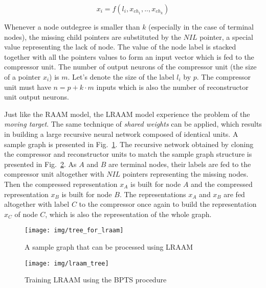 \begin{equation}
x_i = f(l_i, x_{ch_1}, .., x_{ch_k})
\label{eq:lraam_pointer}
\end{equation}

Whenever a node outdegree is smaller than $k$ (especially in the case of terminal nodes), the missing child pointers are substituted by the $NIL$ pointer, a special value representing the lack of node. The value of the node label is stacked together with all the pointers values to form an input vector which is fed to the compressor unit. The number of output neurons of the compressor unit (the size of a pointer $x_i$) is $m$. Let's denote the size of the label $l_i$ by $p$. The compressor unit must have $n = p + k \cdot m$ inputs which is also the number of reconstructor unit output neurons.

Just like the RAAM model, the LRAAM model experience the problem of the \emph{moving target}. The same technique of \emph{shared weights} can be applied, which results in building a large recursive neural network composed of identical units. A sample graph is presented in Fig.~\ref{fig:tree_for_lraam}. The recursive network obtained by cloning the compressor and reconstructor units to match the sample graph structure is presented in Fig.~\ref{fig:lraam_tree}. As $A$ and $B$ are terminal nodes, their labels are fed to the compressor unit altogether with $NIL$ pointers representing the missing nodes. Then the compressed representation $x_{A}$ is built for node $A$ and the compressed representation $x_{B}$ is built for node $B$. The representations $x_A$ and $x_B$ are fed altogether with label $C$ to the compressor once again to build the representation $x_C$ of node $C$, which is also the representation of the whole graph.

\begin{figure}
\begin{center}
	\texttt{[image: img/tree\_for\_lraam]}
	\caption{A sample graph that can be processed using LRAAM}
	\label{fig:tree_for_lraam}
\end{center}
\end{figure}

\begin{figure}
\begin{center}
	\texttt{[image: img/lraam\_tree]}
	\caption{Training LRAAM using the BPTS procedure}
	\label{fig:lraam_tree}
\end{center}
\end{figure}
